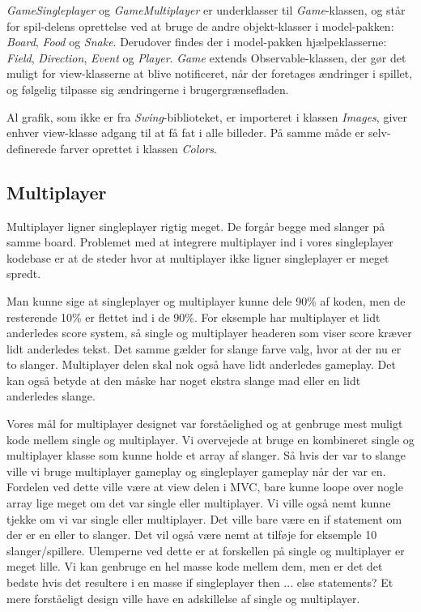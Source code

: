 \textit{GameSingleplayer} og \textit{GameMultiplayer} er underklasser til \textit{Game}-klassen, og står for spil-delens oprettelse ved at bruge de andre objekt-klasser i model-pakken: \textit{Board}, \textit{Food} og \textit{Snake}. Derudover findes der i model-pakken hjælpeklasserne: \textit{Field}, \textit{Direction}, \textit{Event} og \textit{Player}. \textit{Game} extends Observable-klassen, der gør det muligt for view-klasserne at blive notificeret, når der foretages ændringer i spillet, og følgelig tilpasse sig ændringerne i brugergrænsefladen.

Al grafik, som ikke er fra \textit{Swing}-biblioteket, er importeret i klassen \textit{Images}, giver enhver view-klasse adgang til at få fat i alle billeder. På samme måde er selv-definerede farver oprettet i klassen \textit{Colors}.


\subsection{Multiplayer}
Multiplayer ligner singleplayer rigtig meget. De forgår begge med slanger på samme board.  Problemet med at integrere multiplayer ind i vores singleplayer kodebase er at de steder hvor at multiplayer ikke ligner singleplayer er meget spredt.

Man kunne sige at singleplayer og multiplayer kunne dele 90\% af koden, men de resterende 10\% er flettet ind i de 90\%. For eksemple har multiplayer et lidt anderledes score system, så single og multiplayer headeren som viser score kræver lidt anderledes tekst. Det samme gælder for slange farve valg, hvor at der nu er to slanger. Multiplayer delen skal nok også have lidt anderledes gameplay. Det kan også betyde at den måske har noget ekstra slange mad eller en lidt anderledes slange. 

Vores mål for multiplayer designet var forståelighed og at genbruge mest muligt kode mellem single og multiplayer. Vi overvejede at bruge en kombineret single og multiplayer klasse som kunne holde et array af slanger. Så hvis der var to slange ville vi bruge multiplayer gameplay og singleplayer gameplay når der var en. Fordelen ved dette ville være at view delen i MVC, bare kunne loope over nogle array lige meget om det var single eller multiplayer. Vi ville også nemt kunne tjekke om vi var single eller multiplayer. Det ville bare være en if statement om der er en eller to slanger. Det vil også være nemt at tilføje for eksemple 10 slanger/spillere. Ulemperne ved dette er at forskellen på single og multiplayer er meget lille. Vi kan genbruge en hel masse kode mellem dem, men er det det bedste hvis det resultere i en masse if singleplayer then ... else statements? Et mere forståeligt design ville have en adskillelse af single og multiplayer.

